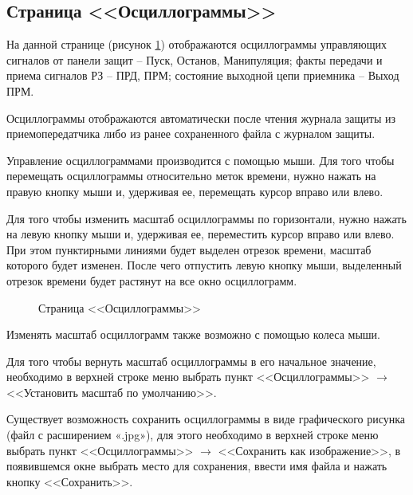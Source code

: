 \subsection{Страница <<Осциллограммы>>}	\label{ssec:configurator_oscillogram}

На данной странице (рисунок \ref{fig:configurator_oscillogram}) отображаются осциллограммы управляющих сигналов от панели защит – Пуск, Останов, Манипуляция; факты передачи и приема сигналов РЗ – ПРД, ПРМ; состояние выходной цепи приемника – Выход ПРМ.

Осциллограммы отображаются автоматически после чтения журнала защиты из приемопередатчика либо из ранее сохраненного файла с журналом защиты.

Управление осциллограммами производится с помощью мыши. Для того чтобы перемещать осциллограммы относительно меток времени, нужно нажать на правую кнопку
мыши и, удерживая ее, перемещать курсор вправо или влево.

Для того чтобы изменить масштаб осциллограммы по горизонтали, нужно нажать на левую кнопку мыши и, удерживая ее, переместить курсор вправо или влево. При этом
пунктирными линиями будет выделен отрезок времени, масштаб которого будет изменен. После чего отпустить левую кнопку мыши, выделенный отрезок времени будет растянут на все окно осциллограмм.

\begin{figure}[H]
	
	\caption{Страница <<Осциллограммы>>}
	\label{fig:configurator_oscillogram}
\end{figure}

Изменять масштаб осциллограмм также возможно с помощью колеса мыши.

Для того чтобы вернуть масштаб осциллограммы в его начальное значение, необходимо в верхней строке меню выбрать пункт <<Осциллограммы>> $\rightarrow$ <<Установить масштаб по умолчанию>>.

Существует возможность сохранить осциллограммы в виде графического рисунка (файл с расширением «.jpg»), для этого необходимо в верхней строке меню выбрать пункт <<Осциллограммы>> $\rightarrow$ <<Сохранить как изображение>>, в появившемся окне выбрать место для сохранения, ввести имя файла и нажать кнопку <<Сохранить>>.
